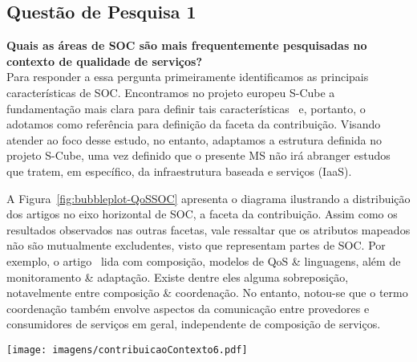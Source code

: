 \subsection{Quest\~{a}o de Pesquisa 1}

\textbf{Quais as áreas de SOC são mais frequentemente pesquisadas no contexto de qualidade de serviços?}
\\[0.01in]


Para responder a essa pergunta primeiramente identificamos as principais caracter\'{i}sticas de SOC. Encontramos no projeto europeu S-Cube a fundamenta\c{c}\~{a}o mais clara para definir tais caracter\'{i}sticas~\cite{SCube-FINALREPORT} e, portanto, o adotamos como refer\^{e}ncia para definição da faceta da contribui\c{c}\~{a}o. Visando atender ao foco desse estudo, no entanto, adaptamos a estrutura definida no projeto S-Cube, uma vez definido que o presente MS não irá abranger estudos que tratem, em específico, da infraestrutura baseada e serviços (IaaS).


A Figura~\ref{fig:bubbleplot-QoSSOC} apresenta o diagrama ilustrando a distribui\c{c}\~{a}o dos artigos no eixo horizontal de SOC, a faceta da contribui\c{c}\~{a}o. Assim como os resultados observados nas outras facetas, vale ressaltar que os atributos mapeados não são mutualmente excludentes, visto que representam partes de SOC. Por exemplo, o artigo~\cite{DBLP:conf/dsn/ZhengL09} lida com composi\c{c}\~{a}o, modelos de QoS \& linguagens, além de monitoramento \& adapta\c{c}\~{a}o. Existe dentre eles alguma sobreposição, notavelmente entre composição \& coordenação. No entanto, notou-se que o termo coordenação também envolve aspectos da comunicação entre provedores e consumidores de serviços em geral, independente de composição de serviços. 

\begin{figure*}[htb]
\centering
\texttt{[image: imagens/contribuicaoContexto6.pdf]}
\caption{\emph{Bubble plot} representando os tipos de contribuição e contexto(QoS)}
\label{fig:bubbleplot-QoSSOC}
\end{figure*}

